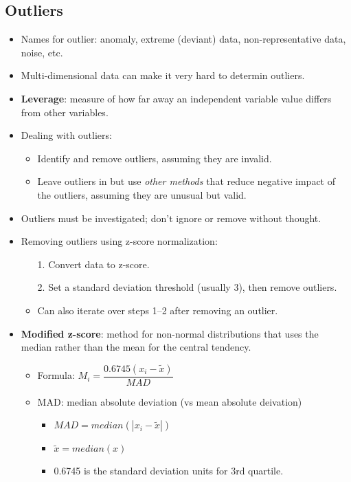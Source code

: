 \documentclass[12pt,a4paper]{article}
\begin{document}
\subsection{Outliers}
\begin{itemize}
    \item Names for outlier: anomaly, extreme (deviant) data, non-representative data, noise, etc.
    \item Multi-dimensional data can make it very hard to determin outliers.
    \item \textbf{Leverage}: measure of how far away an independent variable value differs from other variables.
    \item Dealing with outliers:
        \begin{itemize}
            \item Identify and remove outliers, assuming they are invalid.
            \item Leave outliers in but use \textit{other methods} that reduce negative impact of the outliers, assuming they are unusual but valid.
        \end{itemize}
    \item Outliers must be investigated; don't ignore or remove without thought.
    \item Removing outliers {\color{o-Sun}using z-score normalization}:
        \begin{itemize}
            \item[1.] Convert data to z-score.
            \item[2.] Set a standard deviation threshold (usually 3), then remove outliers.
            \item Can also iterate over steps 1--2 after removing an outlier.
        \end{itemize}
    \item\textbf{Modified z-score}: method for non-normal distributions that uses the median rather than the mean for the central tendency.
        \begin{itemize}
            \item Formula: \(M_i = \dfrac{0.6745(x_i-\tilde{x})}{MAD}\)
            \item MAD: median absolute deviation (vs mean absolute deivation)
                \begin{itemize}
                    \item \(MAD = median(|x_i-\tilde{x}|)\)
                    \item \(\tilde{x}=median(x)\)
                    \item 0.6745 is the standard deviation units for 3rd quartile.

\end{itemize}
\end{itemize}
\end{itemize}
\end{document}
